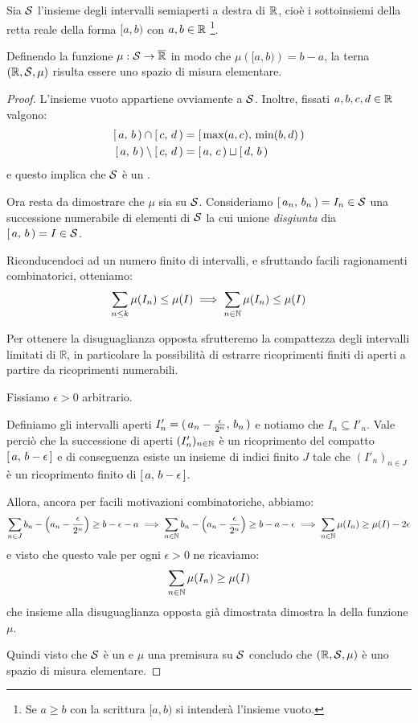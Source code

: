 \begin{theorem}\label{LebesguePremisura}
	Sia $\S$ l'insieme degli intervalli semiaperti a destra di $\R$, cioè i sottoinsiemi della retta reale della forma $[a,b)$ con $a,b\in\R$ \footnote{Se $a\ge b$ con la scrittura $[a,b)$ si intenderà l'insieme vuoto.}.
	
	Definendo la funzione $\mu:\S\to\Rbar$ in modo che $\mu\left([a,b)\right)=b-a$, la terna $(\R,\S,\mu)$ risulta essere uno spazio di misura elementare.
\end{theorem}
\begin{proof}
	L'insieme vuoto appartiene ovviamente a $\S$.
	Inoltre, fissati $a,b,c,d\in\R$ valgono:
	\begin{align*}
		\so ab\cap \so cd &= \so {\max(a,c)}{\min(b,d)}\\
		\so ab\setminus \so cd&= \so ac\sqcup \so db
	\end{align*}
	e questo implica che $\S$ è un \semiring{}.
	
	Ora resta da dimostrare che $\mu$ sia \sigadd{} su $\S$.
	Consideriamo $\so {a_n}{b_n}=I_n\in \S$ una successione numerabile di elementi di $\S$ la cui unione \emph{disgiunta} dia $\so ab=I\in \S$.
	
	Riconducendoci ad un numero finito di intervalli, e sfruttando facili ragionamenti combinatorici, otteniamo:
	\begin{equation*}
		\sum_{n\le k} \mu(I_n)\le \mu(I) \implies \sum_{n\in\N}\mu(I_n)\le \mu(I)
	\end{equation*}
	
	Per ottenere la disuguaglianza opposta sfrutteremo la compattezza degli intervalli limitati di $\mathbb R$, in particolare la possibilità di estrarre ricoprimenti finiti di aperti a partire da ricoprimenti numerabili.
	
	Fissiamo $\epsilon>0$ arbitrario.
	
	Definiamo gli intervalli aperti $I'_n=\oo{a_n-\frac\epsilon{2^n}}{b_n}$ e notiamo che $I_n\subseteq I'_n$.
	Vale perciò che la successione di aperti $(I'_n)_{n\in\N}$ è un ricoprimento del compatto $\cc a{b-\epsilon}$ e di conseguenza esiste un insieme di indici finito $J$ tale che $(I'_n)_{n\in J}$ è un ricoprimento finito di $\cc a{b-\epsilon}$.
	
	Allora, ancora per facili motivazioni combinatoriche, abbiamo:
	\begin{equation*}
		\sum_{n\in J} b_n-\left(a_n-\frac\epsilon{2^n}\right)\ge b-\epsilon-a\implies
		\sum_{n\in\N} b_n-\left(a_n-\frac\epsilon{2^n}\right)\ge b-a-\epsilon \implies
		\sum_{n\in\N} \mu(I_n)\ge \mu(I)-2\epsilon
	\end{equation*}
	e visto che questo vale per ogni $\epsilon>0$ ne ricaviamo:
	\begin{equation*}
		\sum_{n\in\N}\mu(I_n)\ge \mu(I)
	\end{equation*}
	che insieme alla disuguaglianza opposta già dimostrata dimostra la \sigadd[ità] della funzione $\mu$.
	
	Quindi visto che $\S$ è un \semiring{} e $\mu$ una premisura su $\S$ concludo che $(\R,\S,\mu)$ è uno spazio di misura elementare.
\end{proof}

